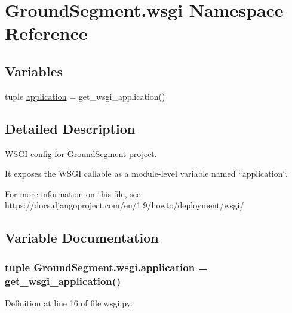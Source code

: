 \hypertarget{namespace_ground_segment_1_1wsgi}{}\section{Ground\+Segment.\+wsgi Namespace Reference}
\label{namespace_ground_segment_1_1wsgi}
\subsection*{Variables}
\begin{DoxyCompactItemize}
\item 
tuple \hyperlink{namespace_ground_segment_1_1wsgi_aeb034272175cec355b04712ebf413192}{application} = get\+\_\+wsgi\+\_\+application()
\end{DoxyCompactItemize}


\subsection{Detailed Description}
\begin{DoxyVerb}WSGI config for GroundSegment project.

It exposes the WSGI callable as a module-level variable named ``application``.

For more information on this file, see
https://docs.djangoproject.com/en/1.9/howto/deployment/wsgi/
\end{DoxyVerb}
 

\subsection{Variable Documentation}
\hypertarget{namespace_ground_segment_1_1wsgi_aeb034272175cec355b04712ebf413192}{}
\subsubsection[{application}]{\setlength{\rightskip}{0pt plus 5cm}tuple Ground\+Segment.\+wsgi.\+application = get\+\_\+wsgi\+\_\+application()}\label{namespace_ground_segment_1_1wsgi_aeb034272175cec355b04712ebf413192}


Definition at line 16 of file wsgi.\+py.

